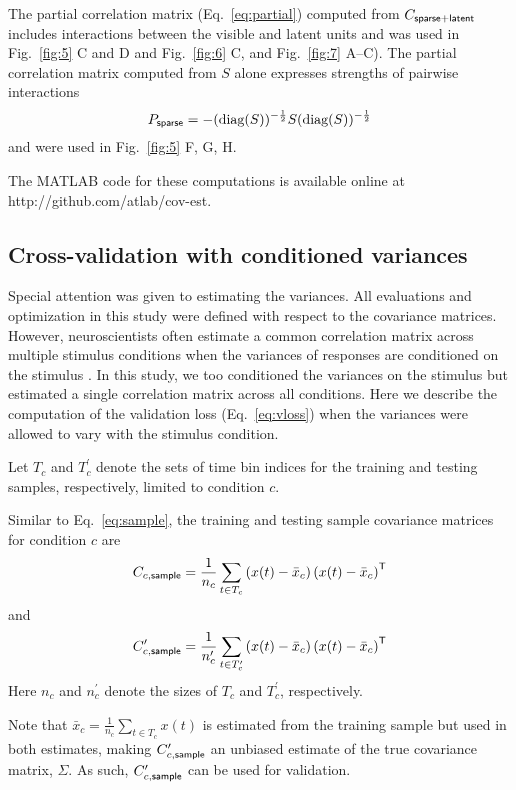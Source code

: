 The partial correlation matrix (Eq.~\ref{eq:partial}) computed from $C_{\sf sparse+latent}$ includes interactions between the visible and latent units and was used in Fig.~\ref{fig:5} C and D and Fig.~\ref{fig:6} C, and Fig.~\ref{fig:7} A--C).  The partial correlation matrix computed from $S$ alone expresses strengths of pairwise interactions
\begin{equation}
P_{\sf sparse} = -(\mbox{diag}(S))^{-\frac 1 2} S  (\mbox{diag}(S))^{-\frac 1 2}
\end{equation}
and were used in Fig.~\ref{fig:5} F, G, H.

The MATLAB code for these computations is available online at http://github.com/atlab/cov-est.
\subsection*{Cross-validation with conditioned variances}
Special attention was given to estimating the variances.  
All evaluations and optimization in this study were defined with respect to the covariance matrices.  
However, neuroscientists often estimate a common correlation matrix across multiple stimulus conditions when the variances of responses are conditioned on the stimulus \cite{Vogels:1989, Ponce:2013}. In this study, we too conditioned the variances on the stimulus but estimated a single correlation matrix across all conditions.
Here we describe the computation of the validation loss (Eq.~\ref{eq:vloss}) when the variances were allowed to vary with the stimulus condition.

Let $T_c$ and $T_c^\prime$ denote the sets of time bin indices for the training and testing samples, respectively, limited to condition $c$. 

Similar to Eq.~\ref{eq:sample}, the training and testing sample covariance matrices for condition $c$ are
\begin{equation}
    C_{c,{\sf sample}}
    = \frac 1{n_c} \sum\limits_{t\in T_c}\left(x(t)-\bar x_c\right)\left(x(t)-\bar x_c\right)^{\sf T}
\end{equation}
and
\begin{equation}
    C_{c,{\sf sample}}^\prime
    = \frac 1{n_c^\prime} \sum\limits_{t\in T_c^\prime}\left(x(t)-\bar x_c\right)\left(x(t)-\bar x_c\right)^{\sf T}
\end{equation}
Here $n_c$ and $n_c^\prime$ denote the sizes of $T_c$ and $T_c^\prime$, respectively.

Note that $\bar x_c= \frac 1 {n_c} \sum\limits_{t \in T_c}x(t)$ is estimated from the training sample but used in both estimates, making $C_{c,\sf sample}^\prime$ an unbiased estimate of the true covariance matrix, $\Sigma$. As such, $C_{c,\sf sample}^\prime$ can be used for validation.

